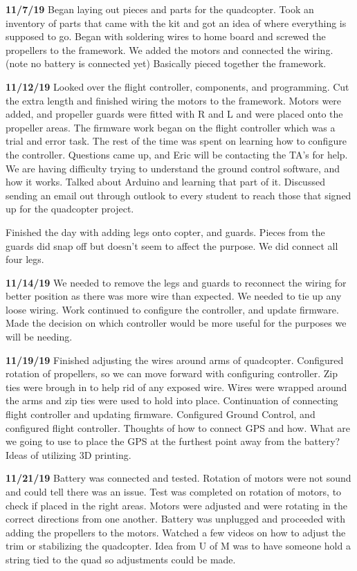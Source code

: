 \textbf{11/7/19}    Began laying out pieces and parts for the quadcopter. Took an inventory of parts that came with the kit and got an idea of where everything is supposed to go. Began with soldering wires to home board and screwed the propellers to the framework. We added the motors and connected the wiring. (note no battery is connected yet) Basically pieced together the framework.

\textbf{11/12/19}    Looked over the flight controller, components, and programming. Cut the extra length and finished wiring the motors to the framework. Motors were added, and propeller guards were fitted with R and L and were placed onto the propeller areas. The firmware work began on the flight controller which was a trial and error task. The rest of the time was spent on learning how to configure the controller. Questions came up, and Eric will be contacting the TA's for help. We are having difficulty trying to understand the ground control software, and how it works. Talked about Arduino and learning that part of it. Discussed sending an email out through outlook to every student to reach those that signed up for the quadcopter project.

Finished the day with adding legs onto copter, and guards. Pieces from the guards did snap off but doesn't seem to affect the purpose. We did connect all four legs.

\textbf{11/14/19}    We needed to remove the legs and guards to reconnect the wiring for better position as there was more wire than expected. We needed to tie up any loose wiring. Work continued to configure the controller, and update firmware. Made the decision on which controller would be more useful for the purposes we will be needing.

\textbf{11/19/19}    Finished adjusting the wires around arms of quadcopter. Configured rotation of propellers, so we can move forward with configuring controller. Zip ties were brough in to help rid of any exposed wire. Wires were wrapped around the arms and zip ties were used to hold into place. Continuation of connecting flight controller and updating firmware. Configured Ground Control, and configured flight controller. Thoughts of how to connect GPS and how. What are we going to use to place the GPS at the furthest point away from the battery? Ideas of utilizing 3D printing.

\textbf{11/21/19}    Battery was connected and tested. Rotation of motors were not sound and could tell there was an issue. Test was completed on rotation of motors, to check if placed in the right areas. Motors were adjusted and were rotating in the correct directions from one another. Battery was unplugged and proceeded with adding the propellers to the motors. Watched a few videos on how to adjust the trim or stabilizing the quadcopter. Idea from U of M was to have someone hold a string tied to the quad so adjustments could be made.

